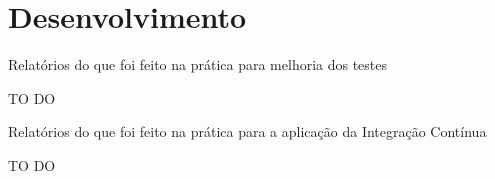 \chapter[Desenvolvimento ]{Desenvolvimento}

Relatórios do que foi feito na prática para melhoria dos testes

TO DO

Relatórios do que foi feito na prática para a aplicação da Integração
Contínua

TO DO

